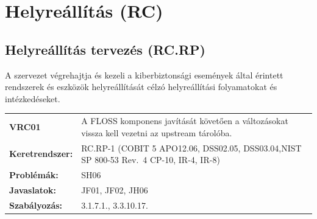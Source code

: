 \documentclass[12pt,magyar,a4paper,oneside]{scrreprt}
\begin{document}
\hypertarget{helyreuxe1lluxedtuxe1s-rc}{%
\section{Helyreállítás (RC)}\label{helyreuxe1lluxedtuxe1s-rc}}

\hypertarget{helyreuxe1lluxedtuxe1s-tervezuxe9s-rc.rp}{%
\subsection{Helyreállítás tervezés
(RC.RP)}\label{helyreuxe1lluxedtuxe1s-tervezuxe9s-rc.rp}}

A szervezet végrehajtja és kezeli a kiberbiztonsági események által
érintett rendszerek és eszközök helyreállítását célzó helyreállítási
folyamatokat és intézkedéseket.

\begin{longtable}[]{@{}ll@{}}
\toprule
\endhead
\begin{minipage}[t]{0.16\columnwidth}\raggedright
\textbf{VRC01}\strut
\end{minipage} & \begin{minipage}[t]{0.79\columnwidth}\raggedright
A FLOSS komponens javítását követően a változásokat vissza kell vezetni
az upstream tárolóba.\strut
\end{minipage}\tabularnewline
\begin{minipage}[t]{0.16\columnwidth}\raggedright
\textbf{Keretrendszer:}\strut
\end{minipage} & \begin{minipage}[t]{0.79\columnwidth}\raggedright
RC.RP-1 (COBIT 5 APO12.06, DSS02.05, DSS03.04,NIST SP 800-53 Rev.~4
CP-10, IR-4, IR-8)\strut
\end{minipage}\tabularnewline
\begin{minipage}[t]{0.16\columnwidth}\raggedright
\textbf{Problémák:}\strut
\end{minipage} & \begin{minipage}[t]{0.79\columnwidth}\raggedright
SH06\strut
\end{minipage}\tabularnewline
\begin{minipage}[t]{0.16\columnwidth}\raggedright
\textbf{Javaslatok:}\strut
\end{minipage} & \begin{minipage}[t]{0.79\columnwidth}\raggedright
JF01, JF02, JH06\strut
\end{minipage}\tabularnewline
\begin{minipage}[t]{0.16\columnwidth}\raggedright
\textbf{Szabályozás:}\strut
\end{minipage} & \begin{minipage}[t]{0.79\columnwidth}\raggedright
3.1.7.1., 3.3.10.17.\strut
\end{minipage}\tabularnewline
\bottomrule
\end{longtable}
\end{document}
